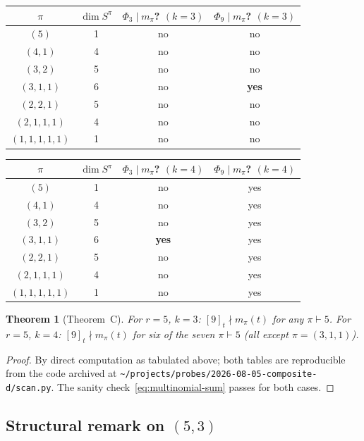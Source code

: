 \documentclass[11pt]{article}
\newtheorem{theorem}{Theorem}
\theoremstyle{plain}
\theoremstyle{definition}
\theoremstyle{remark}
\begin{document}
\begin{center}
\begin{tabular}{c|c|c|c}
$\pi$ & $\dim S^\pi$ & $\Phi_3 \mid m_\pi$? \; $(k=3)$ & $\Phi_9 \mid m_\pi$? \; $(k=3)$ \\ \hline
$(5)$          & 1 & no & no \\
$(4,1)$        & 4 & no & no \\
$(3,2)$        & 5 & no & no \\
$(3,1,1)$      & 6 & no & \textbf{yes} \\
$(2,2,1)$      & 5 & no & no \\
$(2,1,1,1)$    & 4 & no & no \\
$(1,1,1,1,1)$  & 1 & no & no
\end{tabular}
\end{center}

\begin{center}
\begin{tabular}{c|c|c|c}
$\pi$ & $\dim S^\pi$ & $\Phi_3 \mid m_\pi$? \; $(k=4)$ & $\Phi_9 \mid m_\pi$? \; $(k=4)$ \\ \hline
$(5)$          & 1 & no  & yes \\
$(4,1)$        & 4 & no  & yes \\
$(3,2)$        & 5 & no  & yes \\
$(3,1,1)$      & 6 & \textbf{yes} & yes \\
$(2,2,1)$      & 5 & no  & yes \\
$(2,1,1,1)$    & 4 & no  & yes \\
$(1,1,1,1,1)$  & 1 & no  & yes
\end{tabular}
\end{center}

\begin{theorem}[Theorem~C]\label{thm:C}
For $r = 5$, $k = 3$: $[9]_t \nmid m_\pi(t)$ for any $\pi \vdash 5$.
For $r = 5$, $k = 4$: $[9]_t \nmid m_\pi(t)$ for six of the seven
$\pi \vdash 5$ (all except $\pi = (3, 1, 1)$).
\end{theorem}

\begin{proof}
By direct computation as tabulated above; both tables are reproducible
from the code archived at
\texttt{\textasciitilde/projects/probes/2026-08-05-composite-d/scan.py}.
The sanity check~\eqref{eq:multinomial-sum} passes for both cases.
\end{proof}

\subsection{Structural remark on $(5, 3)$}
\end{document}
